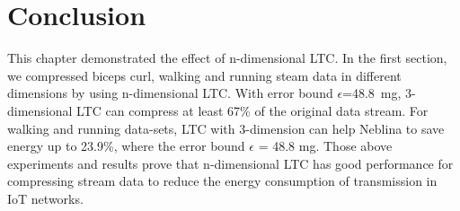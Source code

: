 \section{Conclusion}
This chapter demonstrated the effect of n-dimensional LTC. In the first section,
we compressed biceps curl, walking and running steam data in different
dimensions by using n-dimensional LTC. With error bound $\epsilon$=48.8\ mg,
3-dimensional LTC can compress at least 67\% of the original data stream. For
walking and running data-sets, LTC with 3-dimension can help Neblina to save
energy up to 23.9\%, where the error bound $\epsilon$ = 48.8 mg. Those above
experiments and results prove that n-dimensional LTC has good performance for
compressing stream data to reduce the energy consumption of transmission in IoT
networks.
